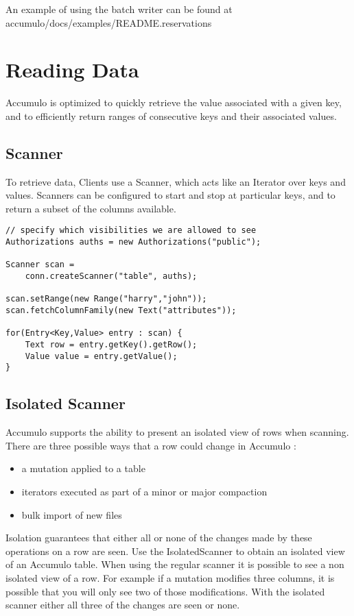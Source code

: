 An example of using the batch writer can be found at\\
accumulo/docs/examples/README.reservations

\section{Reading Data}

Accumulo is optimized to quickly retrieve the value associated with a given key, and
to efficiently return ranges of consecutive keys and their associated values.

\subsection{Scanner}

To retrieve data, Clients use a Scanner, which acts like an Iterator over
keys and values. Scanners can be configured to start and stop at particular keys, and
to return a subset of the columns available.

\begingroup\fontsize{8pt}{8pt}\selectfont\begin{verbatim}
// specify which visibilities we are allowed to see
Authorizations auths = new Authorizations("public");

Scanner scan =
    conn.createScanner("table", auths);

scan.setRange(new Range("harry","john"));
scan.fetchColumnFamily(new Text("attributes"));

for(Entry<Key,Value> entry : scan) {
    Text row = entry.getKey().getRow();
    Value value = entry.getValue();
}
\end{verbatim}\endgroup

\subsection{Isolated Scanner}

Accumulo supports the ability to present an isolated view of rows when
scanning. There are three possible ways that a row could change in Accumulo :

\begin{itemize}
 \item a mutation applied to a table
 \item iterators executed as part of a minor or major compaction
 \item bulk import of new files
\end{itemize}

Isolation guarantees that either all or none of the changes made by these
operations on a row are seen. Use the IsolatedScanner to obtain an isolated
view of an Accumulo table. When using the regular scanner it is possible to see
a non isolated view of a row. For example if a mutation modifies three
columns, it is possible that you will only see two of those modifications.
With the isolated scanner either all three of the changes are seen or none.

